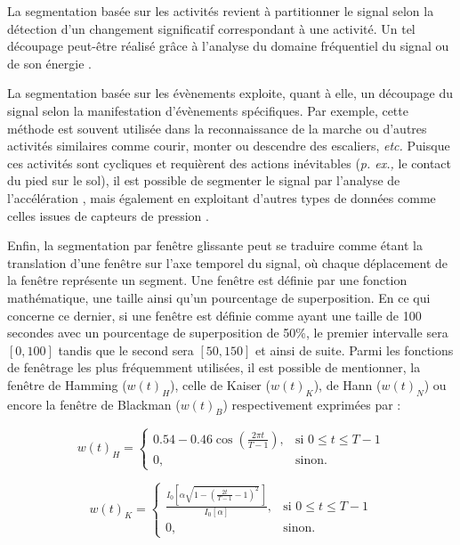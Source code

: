 La segmentation basée sur les activités revient à partitionner le signal selon la détection d'un changement significatif correspondant à une activité. Un tel découpage peut-être réalisé grâce à l'analyse du domaine fréquentiel du signal ou de son énergie \citep{Sekine2000, Guenterberg2009}.

La segmentation basée sur les évènements exploite, quant à elle, un découpage du signal selon la manifestation d'évènements spécifiques. Par exemple, cette méthode est souvent utilisée dans la reconnaissance de la marche ou d'autres activités similaires comme courir, monter ou descendre des escaliers, \textit{etc. } Puisque ces activités sont cycliques et requièrent des actions inévitables (\textit{p. ex., } le contact du pied sur le sol), il est possible de segmenter le signal par l'analyse de l'accélération \citep{SantAnna2010}, mais également en exploitant d'autres types de données comme celles issues de capteurs de pression \citep{Crea2012}.

Enfin, la segmentation par fenêtre glissante peut se traduire comme étant la translation d'une fenêtre sur l'axe temporel du signal, où chaque déplacement de la fenêtre représente un segment. Une fenêtre est définie par une fonction mathématique, une taille ainsi qu'un pourcentage de superposition. En ce qui concerne ce dernier, si une fenêtre est définie comme ayant une taille de 100 secondes avec un pourcentage de superposition de 50\%, le premier intervalle sera $\left[0,100\right]$ tandis que le second sera $\left[50,150\right]$ et ainsi de suite. Parmi les fonctions de fenêtrage les plus fréquemment utilisées, il est possible de mentionner, la fenêtre de Hamming ($w(t)_H$), celle de Kaiser ($w(t)_K$), de Hann ($w(t)_N$) ou encore la fenêtre de Blackman ($w(t)_B$) respectivement exprimées par :

\begin{equation}
	\label{eq:hamming}
	w\left(t\right)_H = \left\{
	\begin{array}{ll}
		0.54-0.46\cos(\frac{2\pi t}{T-1}), & \mbox{si } 0 \leq t \leq T-1 \\
		0,								   & \mbox{sinon.}
	\end{array}
	\right.
\end{equation}

\begin{equation}
	\label{eq:kaiser}
	w\left(t\right)_K = \left\{
	\begin{array}{ll}
		\frac{I_0\left[\alpha\sqrt{1-(\frac{2t}{T-1}-1)^2}\,\right]}{I_0\left[\alpha\right]}, & \mbox{si } 0 \leq t \leq T-1 \\
		0,                                    & \mbox{sinon.}
	\end{array}
	\right.
\end{equation}

